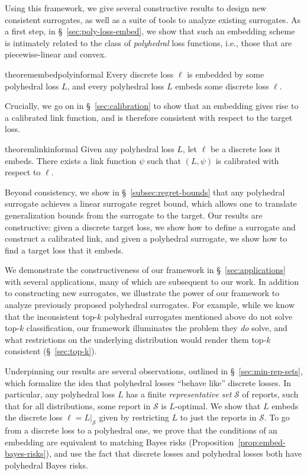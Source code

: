 \documentclass[11pt]{article}
\newcommand{\Sc}{\mathcal{S}}
\begin{document}
Using this framework, we give several constructive results to design new consistent surrogates, as well as a suite of tools to analyze existing surrogates.
As a first step, in \S~\ref{sec:poly-loss-embed}, we show that such an embedding scheme is intimately related to the class of \emph{polyhedral} loss functions, i.e., those that are piecewise-linear and convex.
\begin{restatable}{theorem}{embedpolyinformal}\label{thm:embed-poly-main}
  Every discrete loss $\ell$ is embedded by some polyhedral loss $L$, and every polyhedral loss $L$ embeds some discrete loss $\ell$.
\end{restatable}%
\noindent
Crucially, we go on in \S~\ref{sec:calibration} to show that an embedding gives rise to a calibrated link function, and is therefore consistent with respect to the target loss.
\begin{restatable}{theorem}{linkinformal}\label{thm:link-main}
  Given any polyhedral loss $L$, let $\ell$ be a discrete loss it embeds. There exists a link function $\psi$ such that $(L,\psi)$ is calibrated with respect to $\ell$.
\end{restatable}
\noindent
Beyond consistency, we show in \S~\ref{subsec:regret-bounds} that any polyhedral surrogate achieves a linear surrogate regret bound, which allows one to translate generalization bounds from the surrogate to the target.
Our results are constructive: given a discrete target loss, we show how to define a surrogate and construct a calibrated link, and given a polyhedral surrogate, we show how to find a target loss that it embeds.

We demonstrate the constructiveness of our framework in \S~\ref{sec:applications} with several applications, many of which are subsequent to our work.
In addition to constructing new surrogates, we illustrate the power of our framework to analyze previously proposed polyhedral surrogates.
For example, while we know that the inconsistent top-$k$ polyhedral surrogates mentioned above do not solve top-$k$ classification, our framework illuminates the problem they \emph{do} solve, and what restrictions on the underlying distribution would render them top-$k$ consistent (\S~\ref{sec:top-k}).

Underpinning our results are several observations, outlined in \S~\ref{sec:min-rep-sets}, which formalize the idea that polyhedral losses ``behave like'' discrete losses.
In particular, any polyhedral loss $L$ has a finite \emph{representative set} $\Sc$ of reports, such that for all distributions, some report in $\Sc$ is $L$-optimal.
We show that $L$ embeds the discrete loss $\ell = L|_\Sc$ given by restricting $L$ to just the reports in $\Sc$.
To go from a discrete loss to a polyhedral one, we prove that the conditions of an embedding are equivalent to matching Bayes risks (Proposition~\ref{prop:embed-bayes-risks}), and use the fact that discrete losses and polyhedral losses both have polyhedral Bayes risks.
\end{document}
